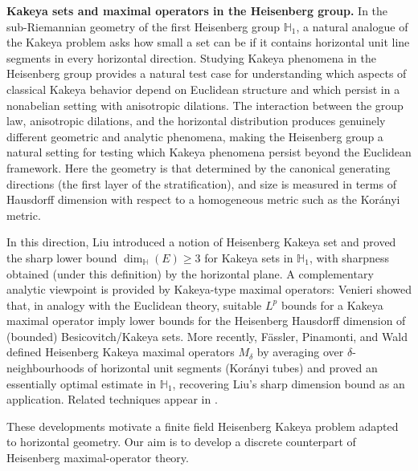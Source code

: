 \documentclass[11pt]{article}
\newcommand{\1}{\mathbf 1}
\begin{document}
\medskip
\noindent\textbf{Kakeya sets and maximal operators in the Heisenberg group.}
In the sub-Riemannian geometry of the first Heisenberg group $\mathbb{H}_1$, a natural
analogue of the Kakeya problem asks how small a set can be if it contains horizontal unit line segments in every horizontal direction. Studying Kakeya phenomena in the Heisenberg group provides a natural test case for understanding which aspects of classical Kakeya behavior depend on Euclidean structure and which persist in a nonabelian setting with anisotropic dilations. The interaction between the group law, anisotropic dilations, and the horizontal distribution produces genuinely different geometric and analytic phenomena, making the Heisenberg group a natural setting for testing which Kakeya phenomena
persist beyond the Euclidean framework. Here the geometry is that determined by the canonical generating directions (the first layer of the stratification), and size is measured in terms of Hausdorff dimension with respect to a homogeneous metric such as the Kor\'{a}nyi metric.

In this direction, Liu \cite{Liu22} introduced a notion of Heisenberg Kakeya set and proved the sharp lower
bound $\dim_{\mathbb{H}}(E)\ge 3$ for Kakeya sets in $\mathbb{H}_1$, with sharpness obtained
(under this definition) by the horizontal plane. A complementary analytic
viewpoint is provided by Kakeya-type maximal operators: Venieri \cite{Venieri14} showed that, in analogy with
the Euclidean theory, suitable $L^p$ bounds for a Kakeya maximal operator imply lower bounds
for the Heisenberg Hausdorff dimension of (bounded) Besicovitch/Kakeya sets.
More recently, F\"assler, Pinamonti, and Wald \cite{FPW25} defined Heisenberg Kakeya maximal operators $M_\delta$
by averaging over $\delta$-neighbourhoods of horizontal unit segments (Kor\'{a}nyi tubes) and
proved an essentially optimal estimate in $\mathbb{H}_1$, recovering Liu's sharp dimension
bound as an application. Related techniques appear in \cite{FP22,HS,Zhang24}.


These developments motivate a finite field Heisenberg Kakeya problem adapted to horizontal geometry. Our aim is to develop a discrete counterpart of Heisenberg maximal-operator theory.
\end{document}
